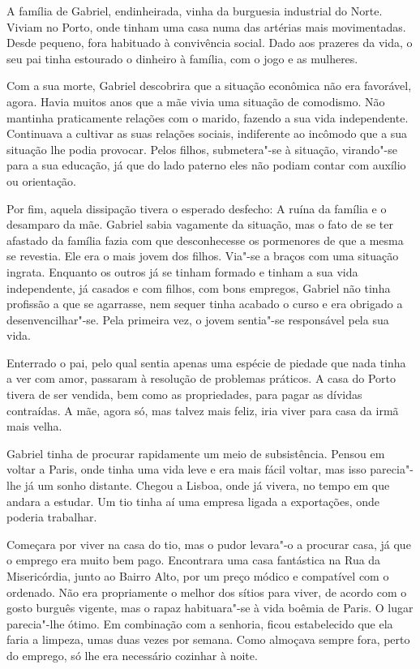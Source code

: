 A família de Gabriel, endinheirada, vinha da burguesia industrial do
Norte. Viviam no Porto, onde tinham uma casa numa das artérias mais
movimentadas. Desde pequeno, fora habituado à convivência social. Dado
aos prazeres da vida, o seu pai tinha estourado o dinheiro à família,
com o jogo e as mulheres.

Com a sua morte, Gabriel descobrira que a situação econômica não era
favorável, agora. Havia muitos anos que a mãe vivia uma situação de
comodismo. Não mantinha praticamente relações com o marido, fazendo a
sua vida independente. Continuava a cultivar as suas relações sociais,
indiferente ao incômodo que a sua situação lhe podia provocar. Pelos
filhos, submetera"-se à situação, virando"-se para a sua educação, já que
do lado paterno eles não podiam contar com auxílio ou orientação.

Por fim, aquela dissipação tivera o esperado desfecho: A ruína da
família e o desamparo da mãe. Gabriel sabia vagamente da situação, mas o
fato de se ter afastado da família fazia com que desconhecesse os
pormenores de que a mesma se revestia. Ele era o mais jovem dos filhos.
Via"-se a braços com uma situação ingrata. Enquanto os outros já se
tinham formado e tinham a sua vida independente, já casados e com
filhos, com bons empregos, Gabriel não tinha profissão a que se
agarrasse, nem sequer tinha acabado o curso e era obrigado a
desenvencilhar"-se. Pela primeira vez, o jovem sentia"-se responsável pela
sua vida.

Enterrado o pai, pelo qual sentia apenas uma espécie de piedade que nada
tinha a ver com amor, passaram à resolução de problemas práticos. A casa
do Porto tivera de ser vendida, bem como as propriedades, para pagar as
dívidas contraídas. A mãe, agora só, mas talvez mais feliz, iria viver
para casa da irmã mais velha.

Gabriel tinha de procurar rapidamente um meio de subsistência. Pensou em
voltar a Paris, onde tinha uma vida leve e era mais fácil voltar, mas
isso parecia"-lhe já um sonho distante. Chegou a Lisboa, onde já vivera,
no tempo em que andara a estudar. Um tio tinha aí uma empresa ligada a
exportações, onde poderia trabalhar.

Começara por viver na casa do tio, mas o pudor levara"-o a procurar casa,
já que o emprego era muito bem pago. Encontrara uma casa fantástica na
Rua da Misericórdia, junto ao Bairro Alto, por um preço módico e
compatível com o ordenado. Não era propriamente o melhor dos sítios para
viver, de acordo com o gosto burguês vigente, mas o rapaz habituara"-se à
vida boêmia de Paris. O lugar parecia"-lhe ótimo. Em combinação com a
senhoria, ficou estabelecido que ela faria a limpeza, umas duas vezes
por semana. Como almoçava sempre fora, perto do emprego, só lhe era
necessário cozinhar à noite.

